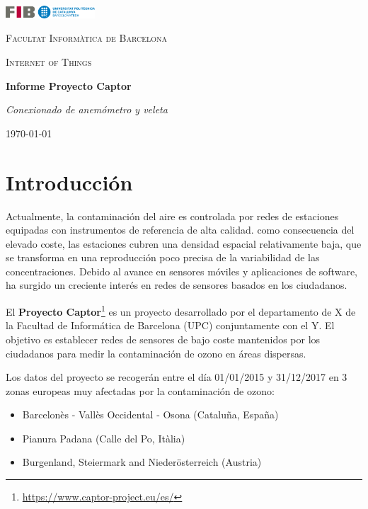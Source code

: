 \documentclass[a4paper, 11pt]{article}
\begin{document}
\begin{titlepage}
	\centering
	\includegraphics[width=0.25\textwidth]{fib.png}\par
	\vspace{2cm}
	{\scshape\LARGE Facultat Informàtica de Barcelona \par}
	\vspace{1cm}
	{\scshape\Large Internet of Things\par}
	\vspace{2cm}
	{\huge\bfseries Informe Proyecto Captor\par}
	\vspace{1cm}
	{\Large\itshape Conexionado de anemómetro y veleta\par}
	\vspace{2cm}
	{\large \today\par}
\end{titlepage}
\newpage

\tableofcontents
\newpage

\listoffigures
\listoftables
\newpage

\section{Introducción}
Actualmente, la contaminación del aire es controlada por redes de estaciones equipadas con instrumentos de referencia de alta calidad. como consecuencia del elevado coste, las estaciones cubren una densidad espacial relativamente baja, que se transforma en una reproducción poco precisa de la variabilidad de las concentraciones. Debido al avance en sensores móviles y aplicaciones de software, ha surgido un creciente  interés en redes de sensores basados en los ciudadanos.

El \textbf{Proyecto Captor}\footnote{\url{https://www.captor-project.eu/es/}} es un proyecto desarrollado por el departamento de X de la Facultad de Informática de Barcelona (UPC) conjuntamente con el Y. El objetivo es establecer redes de sensores de bajo coste mantenidos por los ciudadanos para medir la contaminación de ozono en áreas dispersas.

Los datos del proyecto se recogerán entre el día 01/01/2015 y 31/12/2017 en 3 zonas europeas muy afectadas por la contaminación de ozono:

\begin{itemize}
	\item Barcelonès - Vallès Occidental - Osona (Cataluña, España)
	\item Pianura Padana (Calle del Po, Itàlia)
	\item Burgenland, Steiermark and Niederösterreich (Austria)
\end{itemize}
\end{document}
